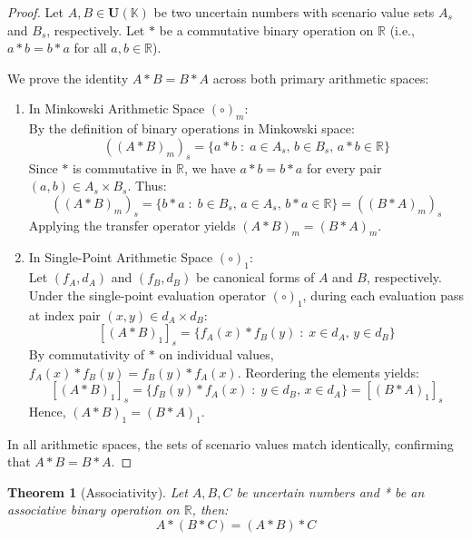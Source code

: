 \documentclass[a4paper,12pt, twoside]{memoir}
\newtheorem{theorem}{Theorem}[chapter]
\newcommand{\tsbd}[1]{\mathbf{U}(\mathbb{#1})}
\newcommand{\kgdd}[1]{\left(#1\right)_1} %
\begin{document}
\begin{proof}
	Let $A, B \in \tsbd{K}$ be two uncertain numbers with scenario value sets $A_s$ and $B_s$, respectively. Let $*$ be a commutative binary operation on $\mathbb{R}$ (i.e., $a * b = b * a$ for all $a, b \in \mathbb{R}$).

	We prove the identity $A * B = B * A$ across both primary arithmetic spaces:

	\begin{enumerate}[leftmargin=*]
		\item In Minkowski Arithmetic Space $(\circ)_m$: \\
		      By the definition of binary operations in Minkowski space:
		      \[
			      ((A * B)_m)_s = \{a * b \;:\; a \in A_s, \, b \in B_s, \, a * b \in \mathbb{R}\}
		      \]
		      Since $*$ is commutative in $\mathbb{R}$, we have $a * b = b * a$ for every pair $(a, b) \in A_s \times B_s$. Thus:
		      \[
			      ((A * B)_m)_s = \{b * a \;:\; b \in B_s, \, a \in A_s, \, b * a \in \mathbb{R}\} = ((B * A)_m)_s
		      \]
		      Applying the transfer operator yields $(A * B)_m = (B * A)_m$.

		\item In Single-Point Arithmetic Space $(\circ)_1$: \\
		      Let $(f_A, d_A)$ and $(f_B, d_B)$ be canonical forms of $A$ and $B$, respectively. Under the single-point evaluation operator $\kgdd{\circ}$, during each evaluation pass at index pair $(x, y) \in d_A \times d_B$:
		      \[
			      [\kgdd{A * B}]_s = \{f_A(x) * f_B(y) \;:\; x \in d_A, \, y \in d_B\}
		      \]
		      By commutativity of $*$ on individual values, $f_A(x) * f_B(y) = f_B(y) * f_A(x)$. Reordering the elements yields:
		      \[
			      [\kgdd{A * B}]_s = \{f_B(y) * f_A(x) \;:\; y \in d_B, \, x \in d_A\} = [\kgdd{B * A}]_s
		      \]
		      Hence, $\kgdd{A * B} = \kgdd{B * A}$.
	\end{enumerate}

	In all arithmetic spaces, the sets of scenario values match identically, confirming that $A * B = B * A$.
\end{proof}
\begin{theorem}[Associativity]
	Let $A,B,C$ be uncertain numbers and * be an associative binary operation on $\mathbb{R}$, then:
	\[A*(B*C) = (A*B)*C\]
\end{theorem}
\end{document}
